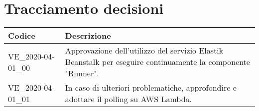 \section{Tracciamento decisioni}
\renewcommand{\arraystretch}{1.8}

\begin{longtable}{|p{5cm}|p{8cm}|}
	\hline
	
	\rowcolor{header}
	\textbf{Codice} & \textbf{Descrizione} \\
	
	\hline
	
	VE\_2020-04-01\_00 & Approvazione dell'utilizzo del servizio Elastik Beanstalk per eseguire continuamente la componente "Runner".\\
	VE\_2020-04-01\_01 & In caso di ulteriori problematiche, approfondire e adottare il polling su AWS Lambda. \\
	\hline
\end{longtable}